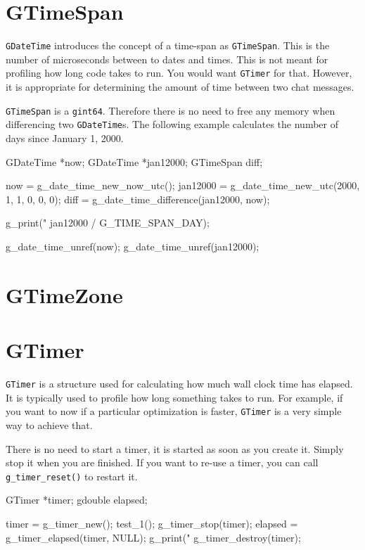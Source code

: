 \section{GTimeSpan}

\verb|GDateTime| introduces the concept of a time-span as \verb|GTimeSpan|.
This is the number of microseconds between to dates and times.
This is not meant for profiling how long code takes to run.
You would want \verb|GTimer| for that.
However, it is appropriate for determining the amount of time between two chat messages.

\verb|GTimeSpan| is a \verb|gint64|.
Therefore there is no need to free any memory when differencing two \verb|GDateTime|s.
The following example calculates the number of days since January 1, 2000.

\begin{code}{}
GDateTime *now;
GDateTime *jan12000;
GTimeSpan diff;

now = g_date_time_new_now_utc();
jan12000 = g_date_time_new_utc(2000, 1, 1, 0, 0, 0);
diff = g_date_time_difference(jan12000, now);

g_print("%
        jan12000 / G_TIME_SPAN_DAY);

g_date_time_unref(now);
g_date_time_unref(jan12000);
\end{code}


\section{GTimeZone}


\section{GTimer}

\verb|GTimer| is a structure used for calculating how much wall clock time has elapsed.
It is typically used to profile how long something takes to run.
For example, if you want to now if a particular optimization is faster, \verb|GTimer| is a very simple way to achieve that.

There is no need to start a timer, it is started as soon as you create it.
Simply stop it when you are finished.
If you want to re-use a timer, you can call \verb|g_timer_reset()| to restart it.

\begin{code}{}
GTimer *timer;
gdouble elapsed;

timer = g_timer_new();
test_1();
g_timer_stop(timer);
elapsed = g_timer_elapsed(timer, NULL);
g_print("%
g_timer_destroy(timer);

\end{code}


